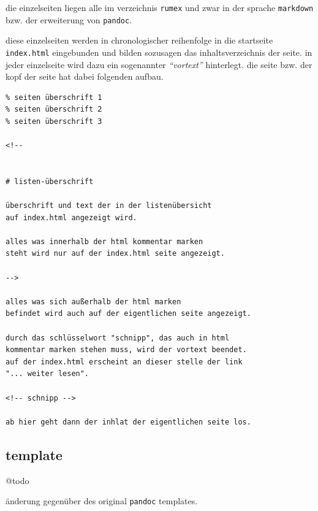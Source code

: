 die einzelseiten liegen alle im verzeichnis \texttt{rumex} und zwar in
der sprache \texttt{markdown} bzw. der erweiterung von \texttt{pandoc}.

diese einzelseiten werden in chronologischer reihenfolge in die
startseite \texttt{index.html} eingebunden und bilden sozusagen das
inhaltsverzeichnis der seite. in jeder einzelseite wird dazu ein
sogenannter \emph{``vortext''} hinterlegt. die seite bzw. der kopf der
seite hat dabei folgenden aufbau.

\begin{verbatim}
% seiten überschrift 1
% seiten überschrift 2
% seiten überschrift 3

<!--


# listen-überschrift

überschrift und text der in der listenübersicht
auf index.html angezeigt wird.

alles was innerhalb der html kommentar marken
steht wird nur auf der index.html seite angezeigt.

-->

alles was sich außerhalb der html marken
befindet wird auch auf der eigentlichen seite angezeigt.

durch das schlüsselwort "schnipp", das auch in html
kommentar marken stehen muss, wird der vortext beendet.
auf der index.html erscheint an dieser stelle der link
"... weiter lesen".

<!-- schnipp -->

ab hier geht dann der inhlat der eigentlichen seite los.
\end{verbatim}

\subsection{template}\label{template}

@todo

änderung gegenüber des original \texttt{pandoc} templates.

